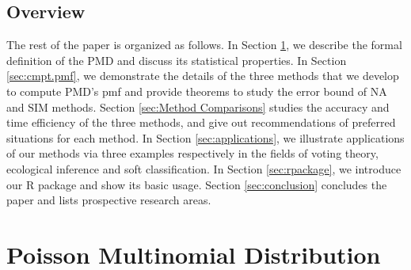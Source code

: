 \documentclass[12pt]{article}
\newcommand{\PMD}{\textrm{PMD}}
\newcommand{\SIM}{{\textrm{SIM}}}
\newcommand{\NA}{{\textrm{NA}}}
\begin{document}






\subsection{Overview}
The rest of the paper is organized as follows. In Section \ref{sec:pmd}, we describe the formal definition of the PMD and discuss its statistical properties. In Section \ref{sec:cmpt.pmf}, we demonstrate the details of  the three methods that we develop to compute $\PMD$'s pmf and provide theorems to study the error bound of $\NA$ and $\SIM$ methods. Section \ref{sec:Method Comparisons} studies the accuracy and time efficiency of the three methods, and give out recommendations of preferred situations for each method. In Section \ref{sec:applications}, we illustrate applications of our methods via three examples respectively in the fields of voting theory, ecological inference and soft classification. In Section \ref{sec:rpackage}, we introduce our R package and show its basic usage. Section \ref{sec:conclusion} concludes the paper and lists prospective research areas.




\section{Poisson Multinomial Distribution} \label{sec:pmd}
\end{document}
